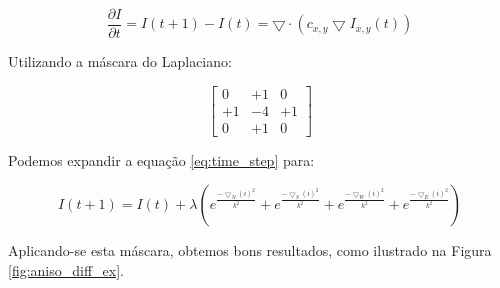 \documentclass[10pt,a4paper]{article}
\begin{document}
\begin{equation}
  \frac{\partial I}{\partial t} = I(t + 1) - I(t) = \bigtriangledown \cdot (c_{x,y} \bigtriangledown I_{x,y}(t))
  \label{eq:time_step}
\end{equation}

Utilizando a máscara do Laplaciano:

\begin{equation}
  \left[\begin{array}{ccc}
    0 & +1 & 0\\
    +1 & -4 & +1\\
    0 & +1 & 0
  \end{array}\right]
  \label{mask:aniso_diff}
\end{equation}

Podemos expandir a equação \ref{eq:time_step} para:

\begin{equation}
  I(t + 1) = I(t) + \lambda (e^{\frac{-\bigtriangledown_N(i)^2}{k^2}} + e^{\frac{-\bigtriangledown_S(i)^2}{k^2}} + e^{\frac{-\bigtriangledown_W(i)^2}{k^2}} + e^{\frac{-\bigtriangledown_E(i)^2}{k^2}})
  \label{eq:time_step}
\end{equation} 

Aplicando-se esta máscara, obtemos bons resultados, como ilustrado na Figura \ref{fig:aniso_diff_ex}.
\end{document}
